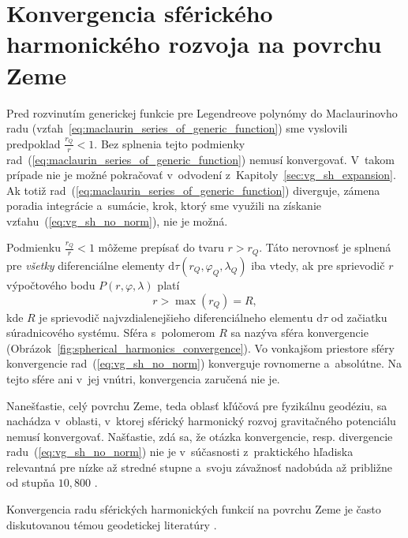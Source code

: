 \documentclass[a4paper, 12pt]{book}
\newcommand{\diff}{\mathrm d}
\begin{document}

\section{Konvergencia sférického harmonického rozvoja na povrchu Zeme}
\label{sec:convergence_of_spherical_harmonics}

Pred rozvinutím generickej funkcie pre Legendreove polynómy do Maclaurinovho
radu (vzťah~\ref{eq:maclaurin_series_of_generic_function}) sme vyslovili
predpoklad $\frac{r_Q}{r} < 1$.  Bez splnenia tejto podmienky
rad~(\ref{eq:maclaurin_series_of_generic_function}) nemusí konvergovať.
V~takom prípade nie je možné pokračovať v~odvodení
z~Kapitoly~\ref{sec:vg_sh_expansion}.  Ak totiž
rad~(\ref{eq:maclaurin_series_of_generic_function}) diverguje, zámena poradia
integrácie a~sumácie, krok, ktorý sme využili na získanie
vzťahu~(\ref{eq:vg_sh_no_norm}), nie je možná.

Podmienku $\frac{r_Q}{r} < 1$ môžeme prepísať do tvaru $r > r_Q$.  Táto
nerovnosť je splnená pre \emph{všetky} diferenciálne elementy $\diff \tau(r_Q,
\varphi_Q, \lambda_Q)$ iba vtedy, ak pre sprievodič $r$ výpočtového bodu $P(r,
\varphi, \lambda)$ platí
%
\begin{equation}
r > \max(r_Q) = R{,}
\end{equation}
%
kde $R$ je sprievodič najvzdialenejšieho diferenciálneho elementu $\diff\tau$
od začiatku súradnicového systému.  Sféra s~polomerom $R$ sa nazýva sféra
konvergencie \citep{Hotine}
(Obrázok~\ref{fig:spherical_harmonics_convergence}).  Vo vonkajšom priestore
sféry konvergencie rad~(\ref{eq:vg_sh_no_norm}) konverguje rovnomerne
a~absolútne.  Na tejto sfére ani v~jej vnútri, konvergencia zaručená nie je.

Nanešťastie, celý povrchu Zeme, teda oblasť kľúčová pre fyzikálnu geodéziu, sa
nachádza v~oblasti, v~ktorej sférický harmonický rozvoj gravitačného potenciálu
nemusí konvergovať.  Našťastie, zdá sa, že otázka konvergencie,
resp. divergencie radu~(\ref{eq:vg_sh_no_norm}) nie je v~súčasnosti
z~praktického hľadiska relevantná pre nízke až stredné stupne a~svoju závažnosť
nadobúda až približne od stupňa $10{,}800$ \citep{Hirt2016,Rexer2017}.

Konvergencia radu sférických harmonických funkcií na povrchu Zeme je často
diskutovanou témou geodetickej literatúry
\citep{Hotine,Krarup1969,MoritzAdvancedGeodesy,Sjoberg1980,Jekeli1983,SansoGeoidDetermination}.
\end{document}
